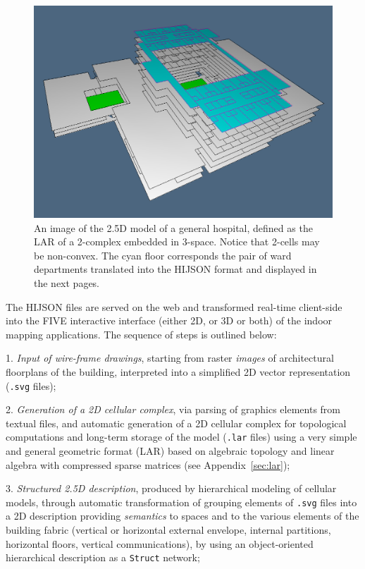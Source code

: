 \begin{figure}[ptb] %
 \centering
 \includegraphics[width=\linewidth]{images/hospital2} 
 \caption{An image of the 2.5D model of a general hospital, defined as the LAR of a 2-complex embedded in 3-space. Notice that 2-cells may be non-convex. The cyan floor corresponds the pair of ward departments translated into the HIJSON format and displayed in the next pages.}
 \label{fig:hospital2}
\end{figure}

 The HIJSON  files are served on the web and transformed real-time client-side into the FIVE interactive interface (either 2D, or 3D or both) of the indoor mapping applications. The sequence of steps is outlined below:

1. \textit{Input of wire-frame drawings},
  starting from   raster \emph{images} of architectural floorplans of the building, interpreted into a simplified 2D vector representation (\texttt{.svg} files);

2. \textit{Generation of a 2D cellular complex}, via
  parsing of graphics elements from textual files, and automatic generation of a 2D cellular complex for topological computations and long-term storage of the model (\texttt{.lar} files) using a very simple and general geometric format (LAR) based on algebraic topology and linear algebra with compressed sparse matrices (see Appendix~\ref{sec:lar});

3. \textit{Structured 2.5D description}, produced by
  hierarchical modeling of cellular models, through automatic transformation of grouping elements of \texttt{.svg} files into a 2D description providing \emph{semantics} to spaces and  to the various elements of the building fabric (vertical or horizontal external envelope, internal partitions, horizontal floors, vertical communications), by using an object-oriented hierarchical description as a  \texttt{Struct} network;

